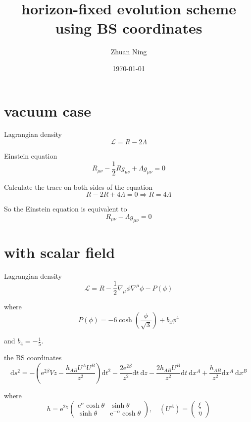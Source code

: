 \documentclass[12pt,a4paper]{article}
\title{horizon-fixed evolution scheme using BS coordinates}
\author{Zhuan Ning}
\date{\today}
\numberwithin{equation}{section}
\begin{document}
\maketitle

\section{vacuum case}

Lagrangian density
\begin{equation}
    \mathcal{L}=R-2\Lambda
\end{equation}

Einstein equation
\begin{equation}
    R_{\mu\nu}-\frac{1}{2}R g_{\mu\nu}+\Lambda g_{\mu\nu}=0
\end{equation}

Calculate the trace on both sides of the equation
\begin{equation}
    R-2R+4\Lambda=0\Rightarrow R=4\Lambda
\end{equation}

So the Einstein equation is equivalent to
\begin{equation}
    R_{\mu\nu}-\Lambda g_{\mu\nu}=0
\end{equation}

\section{with scalar field}

Lagrangian density
\begin{equation}
    \mathcal{L}=R-\frac{1}{2}\nabla_\mu\phi\nabla^\mu\phi-P(\phi)
\end{equation}

where
\begin{equation}
    P(\phi)=-6\cosh(\frac{\phi}{\sqrt{3}})+b_4\phi^4
\end{equation}

and $b_4=-\frac{1}{5}$.

the BS coordinates
\begin{equation}
    \mathrm{d}s^2=-\left(\mathrm{e}^{2\beta}Vz-\frac{h_{AB}U^AU^B}{z^2}\right)\mathrm{d}t^2-\frac{2\mathrm{e}^{2\beta}}{z^2}\mathrm{d}t\mathrm{~d}z-\frac{2h_{AB}U^B}{z^2}\mathrm{d}t\mathrm{~d}x^A+\frac{h_{AB}}{z^2}\mathrm{d}x^A\mathrm{~d}x^B
\end{equation}

where
\begin{equation}
    h=\mathrm{e}^{2\chi}\begin{pmatrix}\mathrm{e}^\alpha\cosh\theta&\sinh\theta\\\sinh\theta&\mathrm{e}^{-\alpha}\cosh\theta\end{pmatrix},
    \quad(U^{A})=\left(\begin{array}{c}
        \xi\\
        \eta
        \end{array}\right)
\end{equation}
\end{document}
